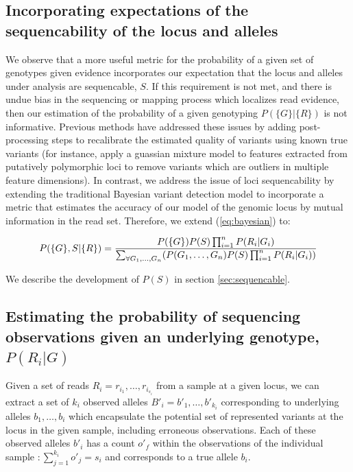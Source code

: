 \documentclass{article}
\begin{document}
\subsection{Incorporating expectations of the sequencability of the locus and alleles}
\label{sec:modelsequencability}

We observe that a more useful metric for the probability of a given set of genotypes given evidence incorporates our expectation that the locus and alleles under analysis are sequencable, $S$.  If this requirement is not met, and there is undue bias in the sequencing or mapping process which localizes read evidence, then our estimation of the probability of a given genotyping $P(\{G\}|\{R\})$ is not informative.  Previous methods have addressed these issues by adding post-processing steps to recalibrate the estimated quality of variants using known true variants (for instance, \cite{gatk2011} apply a guassian mixture model to features extracted from putatively polymorphic loci to remove variants which are outliers in multiple feature dimensions).  In contrast, we address the issue of loci sequencability by extending the traditional Bayesian variant detection model to incorporate a metric that estimates the accuracy of our model of the genomic locus by mutual information in the read set.  Therefore, we extend (\ref{eq:bayesian}) to:

\begin{equation}
\label{eq:bayesianandmodel}
P(\{G\}, S | \{R\})  = { P(\{G\}) P(S) \prod_{i=1}^n P(R_i|G_i) \over 
\sum_{\forall{G_1,\ldots,G_n}} ( P(G_1,\ldots,G_n) P(S) \prod_{i=1}^n P(R_i|G_i) ) }
\end{equation}

We describe the development of $P(S)$ in section \ref{sec:sequencable}.

\subsection{Estimating the probability of sequencing observations given an underlying genotype, $P(R_i|G)$}

Given a set of reads $R_i = r_{i_1},\ldots,r_{i_{s_i}}$ from a sample at a given locus, we can extract a set of $k_i$ observed alleles $B'_i = b'_1,\ldots,b'_{k_i}$ corresponding to underlying alleles $b_1,\ldots,b_i$ which encapsulate the potential set of represented variants at the locus in the given sample, including erroneous observations.  Each of these observed alleles $b'_i$ has a count $o'_f$ within the observations of the individual sample $: \sum_{j=1}^{k_i} o'_j = s_i$ and corresponds to a true allele $b_i$.
\end{document}
